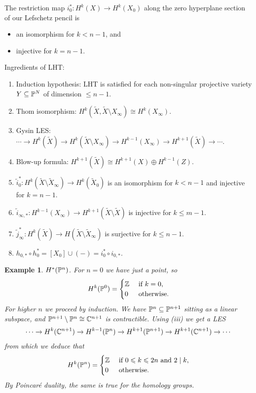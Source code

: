 \documentclass[A4paper, british, reqno]{amsart}
\theoremstyle{darkgreentheorem}
\theoremstyle{darkbluedefinition}
\theoremstyle{darkredexample}
\newtheorem{exa}[thm]{Example}
\theoremstyle{remark}
\newcommand{\1}{\mathbbm{1}}
\newcommand{\op}{\oplus}
\newcommand{\sub}{\subseteq}
\begin{document}
The restriction map $i_{0}^{*}\colon H^{k}(X)\to H^{k}(X_{0})$ along the zero hyperplane section of our Lefschetz pencil is
\begin{itemize}
    \item an isomorphism for $k<n-1$, and
    \item injective for $k=n-1$.
\end{itemize}

Ingredients of LHT:
\begin{enumerate}[label=(\roman*)]
    \item Induction hypothesis: LHT is satisfied for each non-singular projective variety $Y\sub \P^{N}$ of dimension $\leqslant n-1$.
    \item Thom isomorphism: $H^{k}(\tilde{X},\tilde{X}\setminus X_{\infty})\cong H^{k}(X_{\infty})$.
    \item Gysin LES: $\cdots \to H^{k}(\tilde{X})\to H^{k}(\tilde{X}\setminus X_{\infty})\to H^{k-1}(X_{\infty})\to H^{k+1}(\tilde{X})\to \cdots $.
    \item Blow-up formula: $H^{k+1}(\tilde{X})\cong H^{k+1}(X)\op H^{k-1}(Z)$.
    \item $\tilde{i}_{0}^{*}\colon H^{k}(\tilde{X}\setminus \tilde{X}_{\infty})\to H^{k}(\tilde{X}_{0})$ is an isomorphism for $k<n-1$ and injective for $k=n-1$.
    \item $\tilde{i}_{\infty,*}\colon H^{k-1}(X_{\infty})\to H^{k+1}(\tilde{X}\setminus \tilde{X})$ is injective for $k\leqslant m-1$.
    \item $\tilde{j}_{\infty}^{*}\colon H^{k}(\tilde{X})\to H(\tilde{X}\setminus \tilde{X}_{\infty})$ is surjective for $k\leqslant n-1$.
    \item $h_{0,*}\circ h_{0}^{*}=[X_{0}]\cup (-)=i_{0}^{*}\circ i_{0,*}$.
\end{enumerate}

\begin{exa}
    $H^{*}(\P^{n})$.
    For $n=0$ we have just a point, so
    \[ H^{k}(\P^{0})=\begin{cases}
	\Z & \text{ if } k=0, \\
	0 & \text{ otherwise}.
    \end{cases}
    \]
    For higher $n$ we proceed by induction.
    We have $\P^{n}\sub \P^{n+1}$ sitting as a linear subspace, and $\P^{n+1}\setminus \P^{n}\cong \C^{n+1}$ is contractible.
    Using (iii) we get a LES
    \[ \cdots \to H^{k}(\C^{n+1})\to H^{k-1}(\P^{n})\to H^{k+1}(\P^{n+1})\to H^{k+1}(\C^{n+1}) \to \cdots \]
    from which we deduce that
    \[ H^{k}(\P^{n})=\begin{cases}
	\Z &\text{ if }0\leqslant k\leqslant 2n \text{ and } 2\mid k, \\
	0 & \text{ otherwise}.
    \end{cases}
    \]
    By Poincaré duality, the same is true for the homology groups.
\end{exa}
\end{document}

